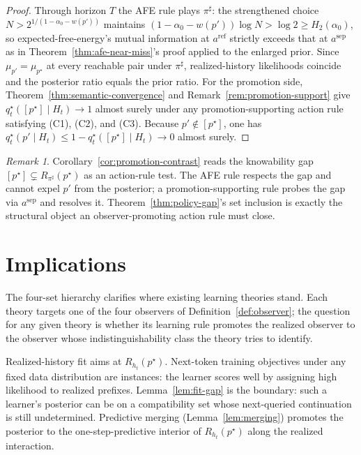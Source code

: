 \documentclass[11pt]{article}
\theoremstyle{definition}
\theoremstyle{remark}
\newtheorem{remark}[theorem]{Remark}
\begin{document}
\begin{proof}
Through horizon $T$ the AFE rule plays $\pi^\sharp$: the strengthened choice $N>2^{1/(1-\alpha_0-w(p'))}$ maintains $(1-\alpha_0-w(p'))\log N>\log 2\ge H_2(\alpha_0)$, so expected-free-energy's mutual information at $a^{\mathrm{ref}}$ strictly exceeds that at $a^{\mathrm{sep}}$ as in Theorem~\ref{thm:afe-near-miss}'s proof applied to the enlarged prior. Since $\mu_{p'}=\mu_{p^\star}$ at every reachable pair under $\pi^\sharp$, realized-history likelihoods coincide and the posterior ratio equals the prior ratio. For the promotion side, Theorem~\ref{thm:semantic-convergence} and Remark~\ref{rem:promotion-support} give $q_t^\star([p^\star]\mid H_t)\to 1$ almost surely under any promotion-supporting action rule satisfying (C1), (C2), and (C3). Because $p'\notin[p^\star]$, one has $q_t^\star(p'\mid H_t)\le 1-q_t^\star([p^\star]\mid H_t)\to 0$ almost surely.
\end{proof}

\begin{remark}
\label{rem:promotion-contrast-interpretation}
Corollary~\ref{cor:promotion-contrast} reads the knowability gap $[p^\star]\subsetneq R_{\pi^\sharp}(p^\star)$ as an action-rule test. The AFE rule respects the gap and cannot expel $p'$ from the posterior; a promotion-supporting rule probes the gap via $a^{\mathrm{sep}}$ and resolves it. Theorem~\ref{thm:policy-gap}'s set inclusion is exactly the structural object an observer-promoting action rule must close.
\end{remark}

\section{Implications}
\label{sec:implications}

The four-set hierarchy clarifies where existing learning theories stand. Each theory targets one of the four observers of Definition~\ref{def:observer}; the question for any given theory is whether its learning rule promotes the realized observer to the observer whose indistinguishability class the theory tries to identify.

Realized-history fit aims at $R_{h_t}(p^\star)$. Next-token training objectives under any fixed data distribution are instances: the learner scores well by assigning high likelihood to realized prefixes. Lemma~\ref{lem:fit-gap} is the boundary: such a learner's posterior can be on a compatibility set whose next-queried continuation is still undetermined. Predictive merging (Lemma~\ref{lem:merging}) promotes the posterior to the one-step-predictive interior of $R_{h_t}(p^\star)$ along the realized interaction.
\end{document}
